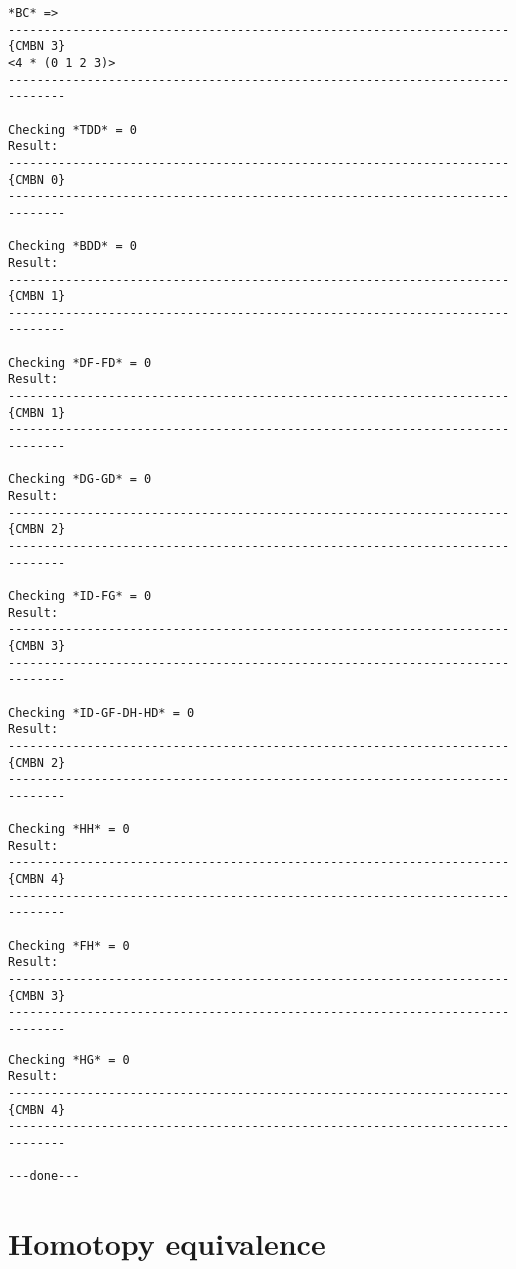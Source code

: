 \newpage
{\footnotesize\begin{verbatim}
*BC* =>
----------------------------------------------------------------------{CMBN 3}
<4 * (0 1 2 3)>
------------------------------------------------------------------------------

Checking *TDD* = 0
Result:
----------------------------------------------------------------------{CMBN 0}
------------------------------------------------------------------------------

Checking *BDD* = 0
Result:
----------------------------------------------------------------------{CMBN 1}
------------------------------------------------------------------------------

Checking *DF-FD* = 0
Result:
----------------------------------------------------------------------{CMBN 1}
------------------------------------------------------------------------------

Checking *DG-GD* = 0
Result:
----------------------------------------------------------------------{CMBN 2}
------------------------------------------------------------------------------

Checking *ID-FG* = 0
Result:
----------------------------------------------------------------------{CMBN 3}
------------------------------------------------------------------------------

Checking *ID-GF-DH-HD* = 0
Result:
----------------------------------------------------------------------{CMBN 2}
------------------------------------------------------------------------------

Checking *HH* = 0
Result:
----------------------------------------------------------------------{CMBN 4}
------------------------------------------------------------------------------

Checking *FH* = 0
Result:
----------------------------------------------------------------------{CMBN 3}
------------------------------------------------------------------------------
\end{verbatim}}
\newpage
{\footnotesize\begin{verbatim}
Checking *HG* = 0
Result:
----------------------------------------------------------------------{CMBN 4}
------------------------------------------------------------------------------

---done---
\end{verbatim}}
\newpage

\section {Homotopy equivalence}

